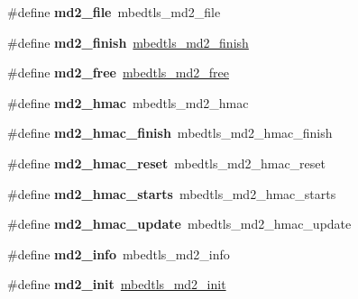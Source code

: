 \begin{DoxyCompactItemize}
\mbox{\label{compat-1_83_8h_a0cca03b008b46c1dec3be0907be19846}} 
\#define {\bfseries md2\+\_\+file}~mbedtls\+\_\+md2\+\_\+file
\item 
\mbox{\label{compat-1_83_8h_aa77d421be10638f698b88b6d27754804}} 
\#define {\bfseries md2\+\_\+finish}~\mbox{\hyperlink{md2_8h_a0774dfae35c9040ba19ee2213a59935e}{mbedtls\+\_\+md2\+\_\+finish}}
\item 
\mbox{\label{compat-1_83_8h_ae7ea8622247f2a7a81d49d0de0e7bc89}} 
\#define {\bfseries md2\+\_\+free}~\mbox{\hyperlink{md2_8h_aa4e7e7bee8322a4409c1d562a9b5efa4}{mbedtls\+\_\+md2\+\_\+free}}
\item 
\mbox{\label{compat-1_83_8h_a3b6d6bdbf887b0ab7a3a9806f0aaa17a}} 
\#define {\bfseries md2\+\_\+hmac}~mbedtls\+\_\+md2\+\_\+hmac
\item 
\mbox{\label{compat-1_83_8h_a6e0b9328a1b0a5ca795c096a113e4a61}} 
\#define {\bfseries md2\+\_\+hmac\+\_\+finish}~mbedtls\+\_\+md2\+\_\+hmac\+\_\+finish
\item 
\mbox{\label{compat-1_83_8h_aba97d06fc166c851a7d311652919fb74}} 
\#define {\bfseries md2\+\_\+hmac\+\_\+reset}~mbedtls\+\_\+md2\+\_\+hmac\+\_\+reset
\item 
\mbox{\label{compat-1_83_8h_ae819ec69e6596e19736b47d1b8f9544e}} 
\#define {\bfseries md2\+\_\+hmac\+\_\+starts}~mbedtls\+\_\+md2\+\_\+hmac\+\_\+starts
\item 
\mbox{\label{compat-1_83_8h_a5275fa7ec03eaa0645549de47c87a31d}} 
\#define {\bfseries md2\+\_\+hmac\+\_\+update}~mbedtls\+\_\+md2\+\_\+hmac\+\_\+update
\item 
\mbox{\label{compat-1_83_8h_a5d3d2f9df50a2b1f9fe1dcaf838980ff}} 
\#define {\bfseries md2\+\_\+info}~mbedtls\+\_\+md2\+\_\+info
\item 
\mbox{\label{compat-1_83_8h_afcb906a00a51a6a6fe9e2d2d4e31879c}} 
\#define {\bfseries md2\+\_\+init}~\mbox{\hyperlink{md2_8h_a13c177d87d53058704c37e0c29fef8b5}{mbedtls\+\_\+md2\+\_\+init}}
\item 

\end{DoxyCompactItemize}
